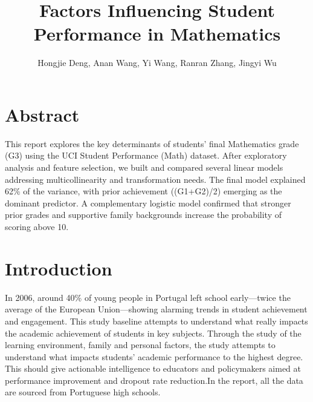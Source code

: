 \documentclass[9pt,twocolumn,twoside,]{pinp}
\title{Factors Influencing Student Performance in Mathematics}
\author[The University of Sydney]{Hongjie Deng, Anan Wang, Yi Wang,
Ranran Zhang, Jingyi Wu}
\begin{document}
\verticaladjustment{-2pt}

\maketitle
\thispagestyle{firststyle}



\section{Abstract}\label{abstract}

This report explores the key determinants of students' final Mathematics
grade (G3) using the UCI Student Performance (Math) dataset. After
exploratory analysis and feature selection, we built and compared
several linear models addressing multicollinearity and transformation
needs. The final model explained 62\% of the variance, with prior
achievement ((G1+G2)/2) emerging as the dominant predictor. A
complementary logistic model confirmed that stronger prior grades and
supportive family backgrounds increase the probability of scoring above
10.

\section{Introduction}\label{introduction}

In 2006, around 40\% of young people in Portugal left school
early---twice the average of the European Union---showing alarming
trends in student achievement and engagement. This study baseline
attempts to understand what really impacts the academic achievement of
students in key subjects. Through the study of the learning environment,
family and personal factors, the study attempts to understand what
impacts students' academic performance to the highest degree. This
should give actionable intelligence to educators and policymakers aimed
at performance improvement and dropout rate reduction.In the report, all
the data are sourced from Portuguese high schools.
\end{document}
